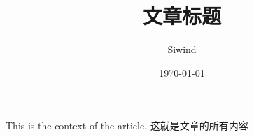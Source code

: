 \documentclass[UTF8]{ctexart}
\title{文章标题}
\author{Siwind}
\date{\today}
\begin{document}
\maketitle
This is the context of the article.
这就是文章的所有内容
\end{document}
